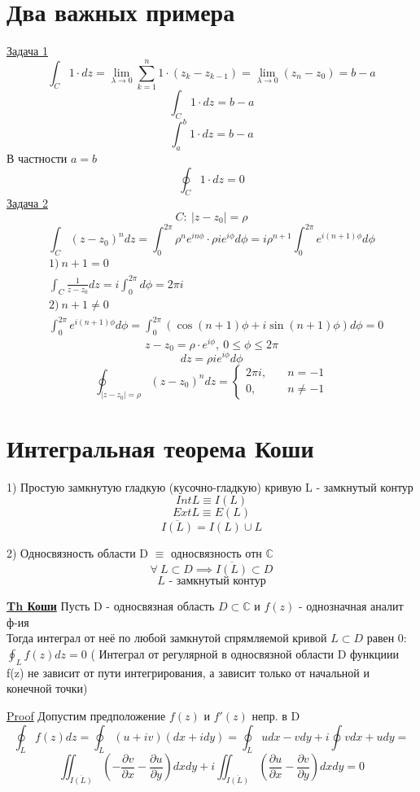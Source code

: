 \documentclass[a4paper]{article}
\begin{document}
\section*{\centering Два важных примера}
\underline{Задача 1}
\[
    \int_C 1 \cdot dz = \lim_{\lambda \to 0} \sum_{k=1}^{n} 1 \cdot (z_k - z_{k-1})
    = \lim_{\lambda \to 0} (z_n - z_0) = b-a
\]
\[
    \int_C 1 \cdot dz = b - a
\]
\[
    \int_a^{b} 1 \cdot dz = b - a
\]
В частности $ a = b $
\[
    \oint_C 1 \cdot dz = 0
\]
\underline{Задача 2}
\[
    C: \ |z - z_0| = \rho
\]
\[
    \int_C (z - z_0)^{n} dz = \int_{0}^{2\pi} \rho^{n} e^{i n \phi} \cdot \rho
    i e^{i\phi}d\phi = i \rho^{n+1} \int_{0}^{2\pi} e^{i(n+1)\phi} d\phi
\]
\[
    \begin{aligned}
        &1) \ n + 1 = 0 \\
        &\int_C \frac{1}{z - z_0} dz = i \int_{0}^{2\pi} d\phi = 2\pi i\\
        &2) \ n + 1 \neq 0\\
        &\int_{0}^{2\pi} e^{i(n+1)\phi} d\phi = \int_{0}^{2\pi} ( \cos(n+1)\phi +i
        \sin(n+1)\phi) d\phi = 0
    \end{aligned}
\]
\[
    z - z_0 = \rho \cdot e^{i\phi}, \ 0 \leq \phi \leq 2\pi
\]
\[
    dz = \rho i e^{i\phi}d\phi
\]
\[
    \oint_{|z - z_0| = \rho} (z - z_0)^{n}dz = 
    \begin{cases}
        2\pi i, &\quad n = -1\\
        0, &\quad n \neq -1
    \end{cases}
\]

\section*{\centering Интегральная теорема Коши}

1) Простую замкнутую гладкую (кусочно-гладкую) кривую L - замкнутый контур
\[
    Int L \equiv I(L)
\]
\[
    Ext L \equiv E(L)
\]
\[
    \overline{I(L)} = I(L) \cup L
\]

2) Односвязность области D $ \equiv $ односвязность отн $ \mathbb{C} $ 
\[
    \forall \ L \subset D \implies \overline{I(L)} \subset D
\]
\[
    L \text{ - замкнутый контур}
\]

\begin{tcolorbox}
\underline{\textbf{Th Коши}} Пусть D - односвязная область $ D \subset \mathbb{C} $ и 
$ f(z) $ - однозначная аналит ф-ия\\
Тогда интеграл от неё по любой замкнутой спрямляемой кривой $ L \subset D $ 
равен 0: $ \oint_L f(z) dz = 0 $ ( Интеграл от регулярной в односвязной области D 
функциии f(z) не зависит от пути интегрирования, а зависит только от начальной и 
конечной точки)

\underline{Proof} Допустим предположение $f(z)$ и $ f'(z) $ непр. в D
\[
    \oint_L f(z) dz = \oint_L (u + iv)(dx + idy) = \oint_L udx - vdy + i 
    \oint vdx + udy =  
\]
\[
    \iint_{\overline{I(L)}} \left(- \frac{\partial v}{\partial x} -
    \frac{\partial u}{\partial y} \right) dxdy + i
    \iint_{\overline{I(L)}} \left( \frac{\partial u}{\partial x} - \frac{\partial v}{\partial y} 
        \right) dxdy = 0
\]
\end{tcolorbox}
\end{document}
